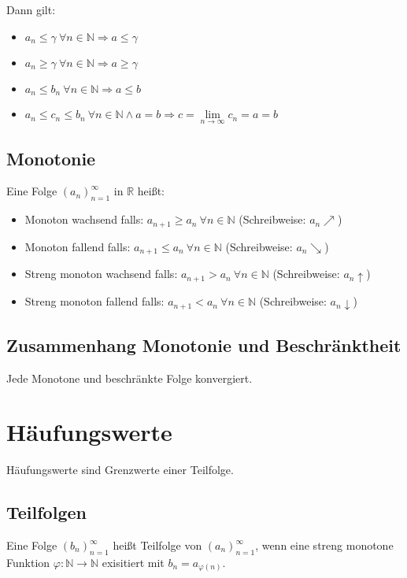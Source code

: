 \documentclass[10pt]{article}
\newcommand{\R}{\mathbb{R}}
\newcommand{\an}{{(a_n)}_{n=1}^\infty}
\begin{document}
    Dann gilt:

    \begin{itemize}
        \item $a_n \leq \gamma\ \forall n \in \mathbb{N} \Rightarrow a \leq \gamma$
        \item $a_n \geq \gamma\ \forall n \in \mathbb{N} \Rightarrow a \geq \gamma$
        \item $a_n \leq b_n\ \forall n \in \mathbb{N} \Rightarrow a \leq b$
        \item $a_n \leq c_n \leq b_n\ \forall n \in \mathbb{N} \wedge a=b
        \Rightarrow c=\lim\limits_{n \rightarrow \infty} c_n = a = b$
    \end{itemize}

    \subsection{Monotonie}
    Eine Folge $\an$ in $\R$ heißt:
    \begin{itemize}
        \item Monoton wachsend falls: $a_{n+1} \geq {a_n}\ \forall n \in \mathbb{N}$ (Schreibweise: $a_n \nearrow$)
        \item Monoton fallend falls: $a_{n+1} \leq {a_n}\ \forall n \in \mathbb{N}$ (Schreibweise: $a_n \searrow$)
        \item Streng monoton wachsend falls: $a_{n+1} > {a_n}\ \forall n \in \mathbb{N}$ (Schreibweise: $a_n \uparrow$)
        \item Streng monoton fallend falls: $a_{n+1} < {a_n}\ \forall n \in \mathbb{N}$ (Schreibweise: $a_n \downarrow$)
    \end{itemize}

    \subsection{Zusammenhang Monotonie und Beschränktheit}
    Jede Monotone und beschränkte Folge konvergiert.

    \section{Häufungswerte}
    Häufungswerte sind Grenzwerte einer Teilfolge.

    \subsection{Teilfolgen}
    Eine Folge ${(b_n)}_{n=1}^\infty$ heißt Teilfolge von $\an$, wenn
    eine streng monotone Funktion $\varphi: \mathbb{N} \rightarrow \mathbb{N}$ exisitiert
    mit $b_n = a_{\varphi(n)}$.
\end{document}
